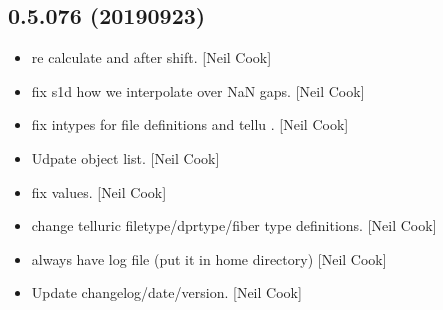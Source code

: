 \documentclass[a4paper,10pt,english]{report}
\begin{document}
\subsection{0.5.076 (2019\sphinxhyphen{}09\sphinxhyphen{}23)}
\label{\detokenize{misc/changelog:id86}}\begin{itemize}
\item {} 
 \sphinxhyphen{} re calculate  and 
after shift. {[}Neil Cook{]}

\item {} 
 \sphinxhyphen{} fix s1d how we interpolate over NaN gaps.
{[}Neil Cook{]}

\item {} 
 \sphinxhyphen{}
fix intypes for file definitions and tellu . {[}Neil Cook{]}

\item {} 
Udpate object list. {[}Neil Cook{]}

\item {} 
 \sphinxhyphen{} fix
 values. {[}Neil Cook{]}

\item {} 
 \sphinxhyphen{} change telluric
filetype/dprtype/fiber type definitions. {[}Neil Cook{]}

\item {} 
 \sphinxhyphen{} always have log file (put it in home directory)
{[}Neil Cook{]}

\item {} 
Update changelog/date/version. {[}Neil Cook{]}

\end{itemize}
\end{document}
